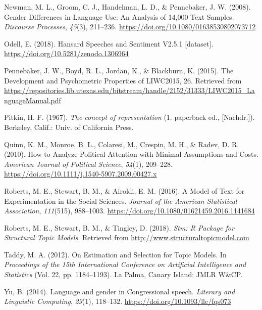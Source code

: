 \documentclass[]{article}
\begin{document}
\leavevmode\hypertarget{ref-newman2008}{}%
Newman, M. L., Groom, C. J., Handelman, L. D., \& Pennebaker, J. W.
(2008). Gender Differences in Language Use: An Analysis of 14,000 Text
Samples. \emph{Discourse Processes}, \emph{45}(3), 211--236.
\url{https://doi.org/10.1080/01638530802073712}

\leavevmode\hypertarget{ref-odell2018}{}%
Odell, E. (2018). Hansard Speeches and Sentiment V2.5.1 {[}dataset{]}.
\url{https://doi.org/10.5281/zenodo.1306964}

\leavevmode\hypertarget{ref-pennebaker2015}{}%
Pennebaker, J. W., Boyd, R. L., Jordan, K., \& Blackburn, K. (2015). The
Development and Psychometric Properties of LIWC2015, 26. Retrieved from
\url{https://repositories.lib.utexas.edu/bitstream/handle/2152/31333/LIWC2015_LanguageManual.pdf}

\leavevmode\hypertarget{ref-pitkin1967}{}%
Pitkin, H. F. (1967). \emph{The concept of representation} (1. paperback
ed., {[}Nachdr.{]}). Berkeley, Calif.: Univ. of California Press.

\leavevmode\hypertarget{ref-quinn2010}{}%
Quinn, K. M., Monroe, B. L., Colaresi, M., Crespin, M. H., \& Radev, D.
R. (2010). How to Analyze Political Attention with Minimal Assumptions
and Costs. \emph{American Journal of Political Science}, \emph{54}(1),
209--228. \url{https://doi.org/10.1111/j.1540-5907.2009.00427.x}

\leavevmode\hypertarget{ref-roberts2016}{}%
Roberts, M. E., Stewart, B. M., \& Airoldi, E. M. (2016). A Model of
Text for Experimentation in the Social Sciences. \emph{Journal of the
American Statistical Association}, \emph{111}(515), 988--1003.
\url{https://doi.org/10.1080/01621459.2016.1141684}

\leavevmode\hypertarget{ref-roberts2018}{}%
Roberts, M. E., Stewart, B. M., \& Tingley, D. (2018). \emph{Stm: R
Package for Structural Topic Models}. Retrieved from
\url{http://www.structuraltopicmodel.com}

\leavevmode\hypertarget{ref-taddy2012}{}%
Taddy, M. A. (2012). On Estimation and Selection for Topic Models. In
\emph{Proceedings of the 15th International Conference on Artificial
Intelligence and Statistics} (Vol. 22, pp. 1184--1193). La Palma, Canary
Island: JMLR W\&CP.

\leavevmode\hypertarget{ref-yu2014}{}%
Yu, B. (2014). Language and gender in Congressional speech.
\emph{Literary and Linguistic Computing}, \emph{29}(1), 118--132.
\url{https://doi.org/10.1093/llc/fqs073}
\end{document}
